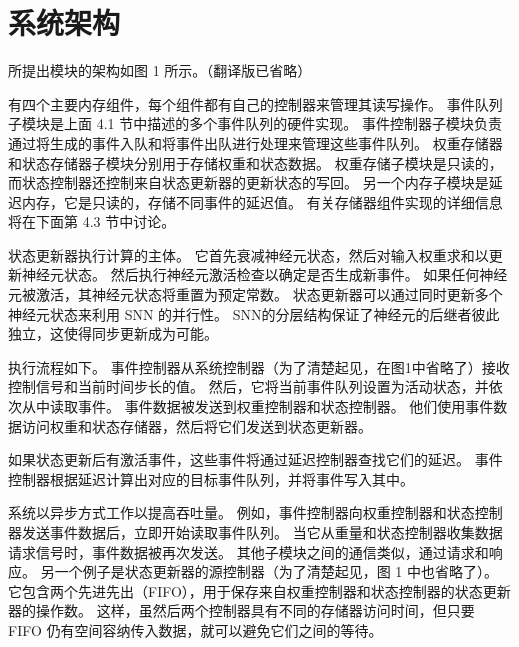 

\section{系统架构}

所提出模块的架构如图 1 所示。（翻译版已省略）

有四个主要内存组件，每个组件都有自己的控制器来管理其读写操作。
事件队列子模块是上面 4.1 节中描述的多个事件队列的硬件实现。
事件控制器子模块负责通过将生成的事件入队和将事件出队进行处理来管理这些事件队列。
权重存储器和状态存储器子模块分别用于存储权重和状态数据。
权重存储子模块是只读的，而状态控制器还控制来自状态更新器的更新状态的写回。
另一个内存子模块是延迟内存，它是只读的，存储不同事件的延迟值。
有关存储器组件实现的详细信息将在下面第 4.3 节中讨论。

状态更新器执行计算的主体。
它首先衰减神经元状态，然后对输入权重求和以更新神经元状态。
然后执行神经元激活检查以确定是否生成新事件。
如果任何神经元被激活，其神经元状态将重置为预定常数。
状态更新器可以通过同时更新多个神经元状态来利用 SNN 的并行性。
SNN的分层结构保证了神经元的后继者彼此独立，这使得同步更新成为可能。

执行流程如下。
事件控制器从系统控制器（为了清楚起见，在图1中省略了）接收控制信号和当前时间步长的值。
然后，它将当前事件队列设置为活动状态，并依次从中读取事件。
事件数据被发送到权重控制器和状态控制器。
他们使用事件数据访问权重和状态存储器，然后将它们发送到状态更新器。

如果状态更新后有激活事件，这些事件将通过延迟控制器查找它们的延迟。
事件控制器根据延迟计算出对应的目标事件队列，并将事件写入其中。

系统以异步方式工作以提高吞吐量。
例如，事件控制器向权重控制器和状态控制器发送事件数据后，立即开始读取事件队列。
当它从重量和状态控制器收集数据请求信号时，事件数据被再次发送。
其他子模块之间的通信类似，通过请求和响应。
另一个例子是状态更新器的源控制器（为了清楚起见，图 1 中也省略了）。
它包含两个先进先出（FIFO），用于保存来自权重控制器和状态控制器的状态更新器的操作数。
这样，虽然后两个控制器具有不同的存储器访问时间，但只要 FIFO 仍有空间容纳传入数据，就可以避免它们之间的等待。

